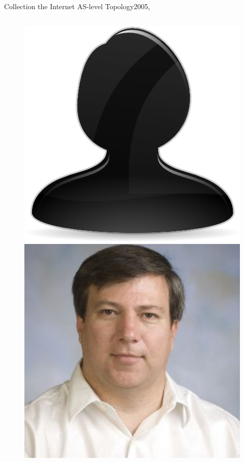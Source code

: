 \documentclass[ngerman,compress,hyperref={bookmarks}]{beamer}
\begin{document}
\begin{frame}{Collection the Internet AS-level Topology}{2005, \cite{Zhang:2005:CIA:1052812.1052825}}
\begin{columns}[c]
\begin{column}{0.08\textwidth}
\begin{figure}
        \includegraphics[width=1\textwidth]{images/person}\\
        \includegraphics[width=1\textwidth]{images/massey}\\

\end{figure}
\end{column}
\end{columns}
\end{frame}
\end{document}
